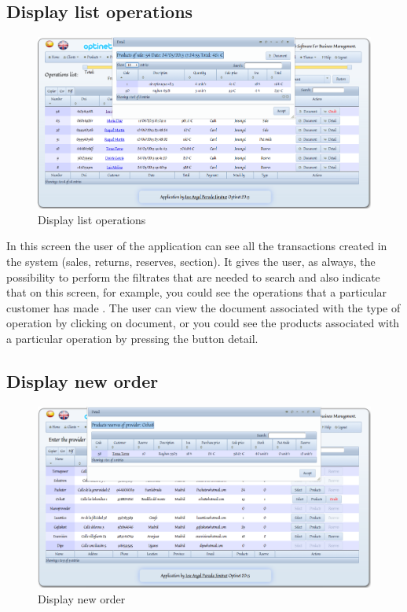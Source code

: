 \documentclass[a4paper,11pt]{book}
\begin{document}
\newpage
\subsection {Display list operations}

\begin{figure}[!htb]
  \centering
    \includegraphics[scale=0.35]{icaplistaroperaciones.png}
  \caption{Display list operations}
  \label{a}
\end{figure}

In this screen the user of the application can see all the transactions created in the system (sales, returns, reserves, section). It gives the user, as always, the possibility to perform the filtrates that are needed to search and also indicate that on this screen, for example, you could see the operations that a particular customer has made . The user can view the document associated with the type of operation by clicking on document, or you could see the products associated with a particular operation by pressing the button detail.

\newpage
\subsection {Display new order}

\begin{figure}[!htb]
  \centering
    \includegraphics[scale=0.35]{icapnuevopedido.png}
  \caption{Display new order}
  \label{a}
\end{figure}
\end{document}
